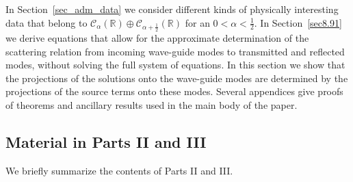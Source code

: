 \documentclass[11pt]{article}
\newcommand\cC{\mathcal{C}}
\newcommand\bbR{\mathbb R}
\theoremstyle{definition}
\theoremstyle{remark}
\begin{document}
In Section~\ref{sec_adm_data} we consider different kinds of physically
interesting data that belong to $\cC_{\alpha}(\bbR)\oplus\cC_{\alpha+\frac
  12}(\bbR)$ for an $0<\alpha<\frac 12.$ In Section~\ref{sec8.91} we derive
equations that allow for the approximate determination of the scattering
relation from incoming wave-guide modes to transmitted and reflected modes,
without solving the full system of equations. In this section we show that the
projections of the solutions onto the wave-guide modes are determined by the
projections of the source terms onto these modes.  Several appendices give
proofs of theorems and ancillary results used  in the main body of the paper.

\subsection{Material in Parts II and III}
We briefly summarize the contents of Parts II and III.
\end{document}
